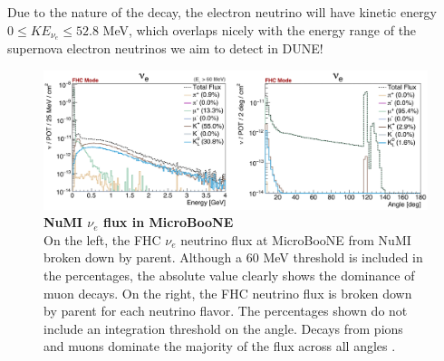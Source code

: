 Due to the nature of the decay, the electron neutrino will have kinetic energy $0 \leqslant KE_{\nu_e} \leqslant 52.8$ MeV, which overlaps nicely with the energy range of the supernova electron neutrinos we aim to detect in DUNE!

\begin{figure}[h!]
    \centering
    \includegraphics[width=180mm]{Figures/numi_nue_flux.jpeg}
    \caption[NuMI $\nu_e$ flux in MicroBooNE]{{\textbf{NuMI $\nu_e$ flux in MicroBooNE}}\\ On the left, the FHC $\nu_e$ neutrino flux at MicroBooNE from NuMI broken down by parent. Although a 60 MeV threshold is included in the percentages, the absolute value clearly shows the dominance of muon decays. On the right, the FHC neutrino flux is broken down by parent for each neutrino flavor. The percentages shown do not include an integration threshold on the angle. Decays from pions and muons dominate the majority of the flux across all angles \cite{krish_phd}.}
    \label{numi_nue_flux}
\end{figure}

